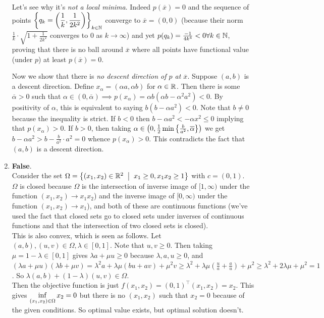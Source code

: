 \begin{enumerate}[leftmargin=*]
Let's see why it's \textit{not a local minima}. Indeed $p(\overline x) = 0$ and the sequence of points $\displaystyle\left\{q_k=\left(\frac{1}{k},\frac{1}{2k^2}\right)\right\}_{k\in\mathbb{N}}$ converge to $\overline x = (0,0)$ (because their norm $\frac{1}{k}\cdot \sqrt{1+\frac{1}{2k^2}}$ converges to $0$ as $k\to\infty$) and yet $p(q_k) = \frac{-1}{4k^4}<0\forall k\in\mathbb{N}$, proving that there is no ball around $\overline x$ where all points have functional value (under $p$) at least $p(\overline x) = 0$.

Now we show that there is \textit{no descent direction of $p$ at $\overline x$}. Suppose $(a,b)$ is a descent direction. Define $x_\alpha = (\alpha a,\alpha b)$ for $\alpha\in \mathbb{R}$. Then there is some $\overline \alpha>0$ such that $\alpha\in(0,\overline \alpha)\implies p(x_\alpha) = \alpha b(\alpha b-\alpha^2a^2)<0$. By positivity of $\alpha$, this is equivalent to saying $b(b-\alpha a^2)<0$. Note that $b\neq 0$ because the inequality is strict. If $b<0$ then $b-\alpha a^2 < -\alpha x^2 \leq 0$ implying that $p(x_\alpha) > 0$. If $b>0$, then taking $\alpha\in \left(0,\frac{1}{2}\min\left\{\frac{b}{a^2},\overline \alpha\right\}\right)$ we get $b-\alpha a^2 > b-\frac{b}{a^2}\cdot a^2 = 0$ whence $p(x_\alpha)>0$. This contradicts the fact that $(a,b)$ is a descent direction.

\item \textbf{False}.\\
Consider the set $\Omega = \set{(x_1,x_2)\in \R^2\st x_1\geq0, x_1x_2\geq 1}$ with $c=(0,1)$. \\
$\Omega$ is closed because $\Omega$ is the intersection of inverse image of $[1,\infty)$ under the function $(x_1,x_2)\to x_1x_2$) and the inverse image of $[0,\infty)$ under the function $(x_1,x_2)\to x_1$), and both of these are continuous functions (we've used the fact that closed sets go to closed sets under inverses of continuous functions and that the intersection of two closed sets is closed). \\
This is also convex, which is seen as follows. Let $(a,b),(u,v)\in \Omega, \lambda\in[0,1]$. Note that $u,v\geq 0$. Then taking $\mu=1-\lambda\in[0,1]$ gives $\lambda a + \mu u \geq 0$ because $\lambda,a,u\geq 0$, and $(\lambda a + \mu u)(\lambda b + \mu v) = \lambda^2 a + \lambda\mu(bu+av) + \mu^2 v \geq \lambda^2 + \lambda\mu\left(\frac{u}{a} + \frac{a}{u}\right) + \mu^2 \ge \lambda^2 + 2\lambda\mu + \mu^2 = 1$. So $\lambda (a,b) + (1-\lambda)(u,v) \in\Omega$.\\
Then the objective function is just $f(x_1,x_2) = (0,1)^\top(x_1,x_2) = x_2$. This gives $\displaystyle\inf_{(x_1,x_2)\in\Omega} x_2 = 0$ but there is no $(x_1,x_2)$ such that $x_2=0$ because of the given conditions. So optimal value exists, but optimal solution doesn't.
\end{enumerate}
